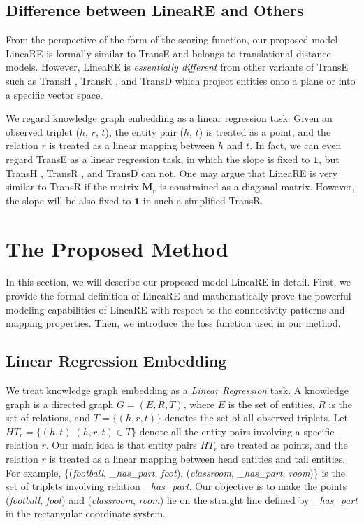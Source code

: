 \documentclass[conference]{IEEEtran}
\begin{document}
\subsection{Difference between LineaRE and Others}
From the perspective of the form of the scoring function, our proposed model LineaRE is formally similar to TransE and belongs to translational distance models. However, LineaRE is \textit{essentially different} from other variants of TransE such as TransH \cite{TransH}, TransR \cite{TransR}, and TransD \cite{TransD} which project entities onto a plane or into a specific vector space.

We regard knowledge graph embedding as a linear regression task. Given an observed triplet ($h$, $r$, $t$), the entity pair ($h$, $t$) is treated as a point, and the relation $r$ is treated as a linear mapping between $h$ and $t$. In fact, we can even regard TransE as a linear regression task, in which the slope is fixed to $\bm{1}$, but TransH \cite{TransH}, TransR \cite{TransR}, and TransD \cite{TransD} can not. One may argue that LineaRE is very similar to TransR if the matrix $\bm{M_r}$ is constrained as a diagonal matrix. However, the slope will be also fixed to $\bm{1}$ in such a simplified TransR.

\section{The Proposed Method}
In this section, we will describe our proposed model LineaRE in detail. First, we provide the formal definition of LineaRE and mathematically prove the powerful modeling capabilities of LineaRE with respect to the connectivity patterns and mapping properties. Then, we introduce the loss function used in our method.

\subsection{Linear Regression Embedding}
We treat knowledge graph embedding as a \textit{Linear Regression} task. A knowledge graph is a directed graph $G=(E,R,T)$, where $E$ is the set of entities, $R$ is the set of relations, and $T=\{ (h, r, t) \}$ denotes the set of all observed triplets. Let $HT_r=\{ (h, t) | (h, r, t) \in T\}$ denote all the entity pairs involving a specific relation $r$. Our main idea is that entity pairs $HT_r$ are treated as points, and the relation $r$ is treated as a linear mapping between head entities and tail entities.
For example, \{(\textit{football}, \textit{\textit{\_has\_part}}, \textit{foot}), (\textit{classroom}, \textit{\_has\_part}, \textit{room})\} is the set of triplets involving relation \textit{\_has\_part}. Our objective is to make the points (\textit{football}, \textit{foot}) and (\textit{classroom}, \textit{room}) lie on the straight line defined by \textit{\_has\_part} in the rectangular coordinate system.
\end{document}
